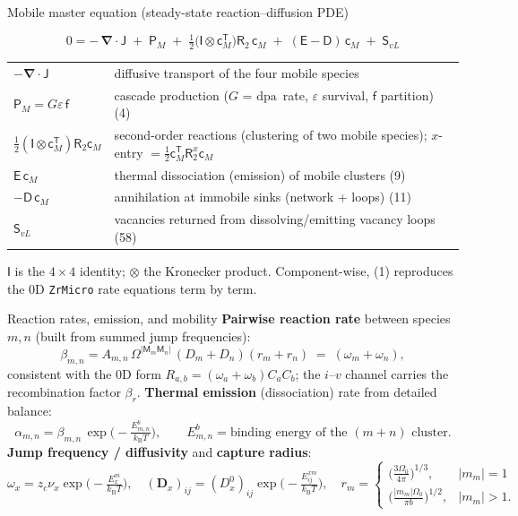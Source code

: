 \documentclass[aspectratio=169,10pt]{beamer}
\newcommand{\sa}[1]{\bm{\mathsf{#1}}}
\newcommand{\ca}[1]{\bm{#1}}
\newcommand{\kB}{k_{\mathrm B}}
\newcommand{\dpa}{\ensuremath{\mathrm{dpa}}}
\begin{document}
\begin{frame}{Mobile master equation (steady-state reaction--diffusion PDE)}
\begin{block}{}
\[
\boxed{\;
0=-\,\ca{\nabla}\!\cdot\sa{J}
\;+\;\sa{P}_M
\;+\;\tfrac12\big(\sa{I}\otimes\sa{c}_M^{\mathsf T}\big)\sa{R}_2\,\sa{c}_M
\;+\;(\sa{E}-\sa{D})\,\sa{c}_M
\;+\;\sa{S}_{vL}
\;}\tag{1}
\]
\end{block}
\small
\begin{tabular}{@{}ll@{}}
$-\ca{\nabla}\!\cdot\sa{J}$ & diffusive transport of the four mobile species\\[2pt]
$\sa{P}_M=G\varepsilon\,\sa{f}$ & cascade production ($G$ = \dpa\ rate, $\varepsilon$ survival, $\sa{f}$ partition) \hfill (4)\\[2pt]
$\tfrac12(\sa{I}\otimes\sa{c}_M^{\mathsf T})\sa{R}_2\sa{c}_M$ & second-order reactions (clustering of two mobile species); $x$-entry $=\tfrac12\sa{c}_M^{\mathsf T}\sa{R}_2^{x}\sa{c}_M$\\[2pt]
$\sa{E}\,\sa{c}_M$ & thermal dissociation (emission) of mobile clusters \hfill (9)\\[2pt]
$-\sa{D}\,\sa{c}_M$ & annihilation at immobile sinks (network + loops) \hfill (11)\\[2pt]
$\sa{S}_{vL}$ & vacancies returned from dissolving/emitting vacancy loops \hfill (58)\\
\end{tabular}
\vfill
\footnotesize $\sa{I}$ is the $4\times4$ identity; $\otimes$ the Kronecker product. Component-wise,
(1) reproduces the 0D \texttt{ZrMicro} rate equations term by term.
\end{frame}

\begin{frame}{Reaction rates, emission, and mobility}
\small
\textbf{Pairwise reaction rate} between species $m,n$ (built from summed jump frequencies):
\[
\beta_{m,n}=A_{m,n}\,\Omega^{|\mathsf M_m\mathsf M_n|}\,(D_m+D_n)(r_m+r_n)
\;=\;(\omega_m+\omega_n),\tag{6,7}
\]
consistent with the 0D form $R_{a,b}=(\omega_a+\omega_b)C_aC_b$; the $i$--$v$ channel carries the
recombination factor $\beta_r$.
\vfill
\textbf{Thermal emission} (dissociation) rate from detailed balance:
\[
\alpha_{m,n}=\beta_{m,n}\,\exp\!\Big(-\tfrac{E^{b}_{m,n}}{\kB T}\Big),
\qquad E^b_{m,n}=\text{binding energy of the }(m{+}n)\text{ cluster}.\tag{10}
\]
\vfill
\textbf{Jump frequency / diffusivity} and \textbf{capture radius}:
\[
\omega_x=z_c\nu_x\exp\!\Big(\!-\tfrac{E^m_x}{\kB T}\Big),\quad
(\ca{D}_x)_{ij}=(D^0_x)_{ij}\exp\!\Big(\!-\tfrac{E^{xm}_{ij}}{\kB T}\Big),\quad
r_m=\!\begin{cases}\big(\tfrac{3\Omega_0}{4\pi}\big)^{1/3}, & |m_m|=1\\[3pt]\big(\tfrac{|m_m|\Omega_0}{\pi b}\big)^{1/2}, & |m_m|>1.\end{cases}\tag{8}
\]
\end{frame}
\end{document}
